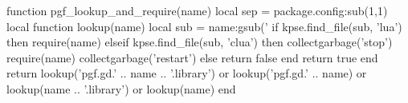\usepackage[useregional]{datetime2}
\usepackage{phonenumbers}
\usepackage{xfrac}
\usepackage{siunitx}
\usepackage{csquotes}

\usepackage{xcolor}
\usepackage{graphicx}
\usepackage{gincltex}
\usepackage{grffile}


\renewcommand{\arraystretch}{1.3}
\hypersetup{unicode}



\let\strong\textbf
\newcommand{\email}[1]{\href{mailto:#1}{\texttt{#1}}}
\newfontfamily{}

\usepackage{nameref}
\makeatletter
\newcommand*{\currentname}{\@currentlabelname}
\makeatother

\newenvironment{iframe}{
	\begin{frame}
	\frametitle{\subsecname}
}{\end{frame}}

\newenvironment{nframe}{
	\begin{frame}[noframenumbering]
	\frametitle{\subsecname}
}{\end{frame}}

\newcommand{\foo}{\makebox[0pt]{\textbullet}\hskip-0.5pt\vrule width 1pt\hspace{\labelsep}}


\usepackage{chronology}

\usepackage{luacode}
\usepackage{tikz}

\usetikzlibrary{graphdrawing,arrows, calc, decorations.markings, positioning}
\begin{luacode*}
	function pgf_lookup_and_require(name)
	local sep = package.config:sub(1,1)
	local function lookup(name)
	local sub = name:gsub('%
	if kpse.find_file(sub, 'lua') then
	require(name)
	elseif kpse.find_file(sub, 'clua') then
	collectgarbage('stop')
	require(name)
	collectgarbage('restart')
	else
	return false
	end
	return true
	end
	return
	lookup('pgf.gd.' .. name .. '.library') or
	lookup('pgf.gd.' .. name) or
	lookup(name .. '.library') or
	lookup(name)
	end
\end{luacode*}
\usepackage[compat=1.1.0]{tikz-feynman}


